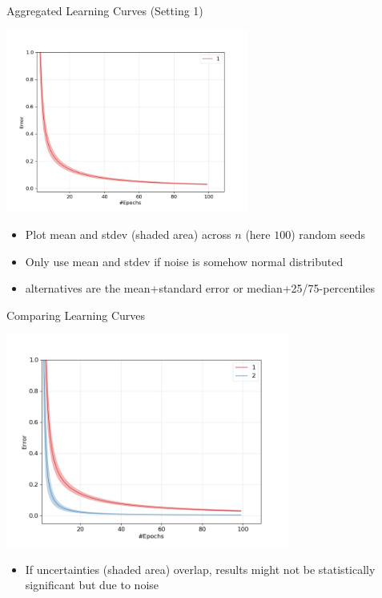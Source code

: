 \begin{frame}[c]{Aggregated Learning Curves (Setting 1)}

\centering
\includegraphics[width=0.6\textwidth]{scripts/hundred_agg_learning_curves.jpg}

\begin{itemize}
	\item Plot mean and stdev (shaded area) across $n$ (here $100$) random seeds\\
	\item Only use mean and stdev
	if noise is somehow normal distributed
	\item alternatives are the mean+standard error or median+25/75-percentiles
\end{itemize}

\end{frame}
\begin{frame}[c]{Comparing Learning Curves}

\centering
\includegraphics[width=0.7\textwidth]{scripts/compare_learning_curves.jpg}

\begin{itemize}
	\item If uncertainties (shaded area) overlap, results might not be statistically significant but due to noise
\end{itemize}

\end{frame}
